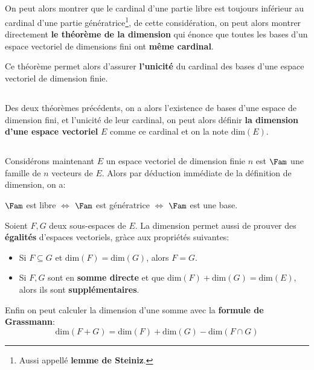 \subsection*{}

On peut alors montrer que le cardinal d'une partie libre est toujours inférieur au cardinal d'une partie génératrice\footnote[1]{Aussi appellé \textbf{lemme de Steiniz}.}, de cette considération, on peut alors montrer directement \textbf{le théorème de la dimension} qui énonce que toutes les bases d'un espace vectoriel de dimensions fini ont \textbf{même cardinal}.\<

Ce théorème permet alors d'assurer \textbf{l'unicité} du cardinal des bases d'une espace vectoriel de dimension finie.
\subsection*{}

Des deux théorèmes précédents, on a alors l'existence de bases d'une espace de dimension fini, et l'unicité de leur cardinal, on peut alors définir \textbf{la dimension d'une espace vectoriel} \(E\) comme ce cardinal et on la note \(\text{dim}(E)\).
\subsection*{}

Considérons maintenant \(E\) un espace vectoriel de dimension finie \(n\) est \(\Fam\) une famille de \(n\) vecteurs de \(E\). Alors par déduction immédiate de la définition de dimension, on a:
\begin{center}
   \(\Fam\) est libre \(\Longleftrightarrow\) \(\Fam\) est génératrice \(\Longleftrightarrow\) \(\Fam\) est une base.
\end{center}
Soient \(F, G\) deux sous-espaces de \(E\). La dimension permet aussi de prouver des \textbf{égalités} d'espaces vectoriels, gràce aux propriétés suivantes:
\begin{itemize}
   \item Si \( F \subseteq G \) et \( \text{dim}(F) = \text{dim}(G) \), alors \( F = G \).
   \item Si \(F, G\) sont en \textbf{somme directe} et que \( \text{dim}(F) + \text{dim}(G) = \text{dim}(E) \), alors ils sont \textbf{supplémentaires}.
\end{itemize}
Enfin on peut calculer la dimension d'une somme avec la \textbf{formule de Grassmann}:
\[ 
   \text{dim}(F + G) = \text{dim}(F) + \text{dim}(G) - \text{dim}(F \cap G)
\]
